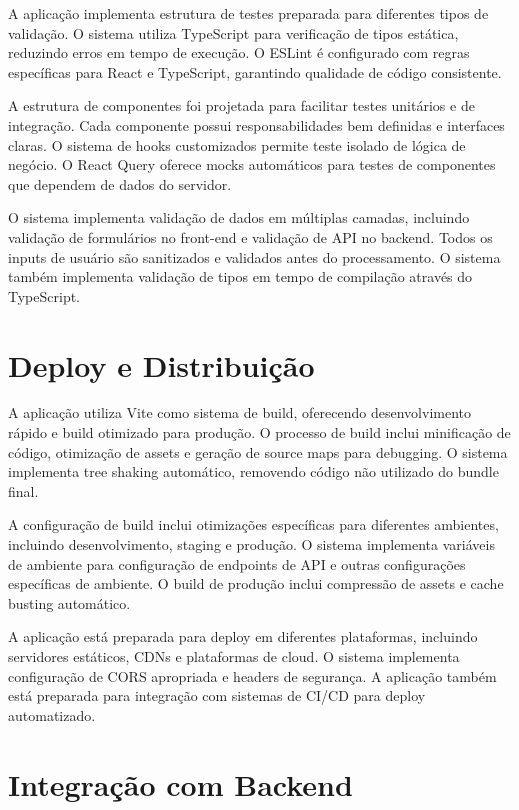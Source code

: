 \documentclass[12pt,a4paper]{article}
\begin{document}
A aplicação implementa estrutura de testes preparada para diferentes tipos de validação. O sistema utiliza TypeScript para verificação de tipos estática, reduzindo erros em tempo de execução. O ESLint é configurado com regras específicas para React e TypeScript, garantindo qualidade de código consistente.

A estrutura de componentes foi projetada para facilitar testes unitários e de integração. Cada componente possui responsabilidades bem definidas e interfaces claras. O sistema de hooks customizados permite teste isolado de lógica de negócio. O React Query oferece mocks automáticos para testes de componentes que dependem de dados do servidor.

O sistema implementa validação de dados em múltiplas camadas, incluindo validação de formulários no front-end e validação de API no backend. Todos os inputs de usuário são sanitizados e validados antes do processamento. O sistema também implementa validação de tipos em tempo de compilação através do TypeScript.

\section{Deploy e Distribuição}

A aplicação utiliza Vite como sistema de build, oferecendo desenvolvimento rápido e build otimizado para produção. O processo de build inclui minificação de código, otimização de assets e geração de source maps para debugging. O sistema implementa tree shaking automático, removendo código não utilizado do bundle final.

A configuração de build inclui otimizações específicas para diferentes ambientes, incluindo desenvolvimento, staging e produção. O sistema implementa variáveis de ambiente para configuração de endpoints de API e outras configurações específicas de ambiente. O build de produção inclui compressão de assets e cache busting automático.

A aplicação está preparada para deploy em diferentes plataformas, incluindo servidores estáticos, CDNs e plataformas de cloud. O sistema implementa configuração de CORS apropriada e headers de segurança. A aplicação também está preparada para integração com sistemas de CI/CD para deploy automatizado.

\section{Integração com Backend}
\end{document}
